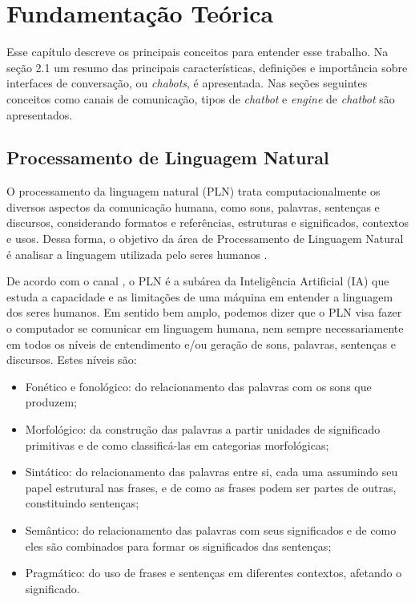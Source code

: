 
\chapter{Fundamentação Teórica}

Esse capítulo descreve os principais conceitos para entender esse trabalho. Na seção 2.1 um resumo das principais características, definições e importância sobre interfaces de conversação, ou \textit{chabots}, é apresentada. Nas seções seguintes conceitos como canais de comunicação, tipos de \textit{chatbot} e \textit{engine} de \textit{chatbot} são apresentados.



\section{Processamento de Linguagem Natural}

O processamento da linguagem natural (PLN) trata computacionalmente os diversos
aspectos da comunicação humana, como sons, palavras, sentenças e discursos,
considerando formatos e referências, estruturas e significados, contextos e usos. Dessa forma, o objetivo da área de Processamento de Linguagem Natural é analisar a linguagem utilizada pelo seres humanos \cite{manning1999foundations}. 

De acordo com o canal , o PLN é a subárea da Inteligência Artificial (IA) que estuda a capacidade e as limitações de uma máquina em entender a linguagem dos seres humanos. Em sentido bem amplo, podemos dizer que o PLN visa fazer o computador se comunicar em linguagem humana, nem sempre necessariamente em todos os níveis de entendimento e/ou geração de sons, palavras, sentenças e discursos. Estes níveis são:

\begin{itemize}

\item Fonético e fonológico: do relacionamento das palavras com os sons que
produzem;
\item Morfológico: da construção das palavras a partir unidades de significado
primitivas e de como classificá-las em categorias morfológicas;
\item Sintático: do relacionamento das palavras entre si, cada uma assumindo seu
papel estrutural nas frases, e de como as frases podem ser partes de outras,
constituindo sentenças;
\item Semântico: do relacionamento das palavras com seus significados e de como
eles são combinados para formar os significados das sentenças; 
\item Pragmático: do uso de frases e sentenças em diferentes contextos, afetando o
significado.

\end{itemize}



